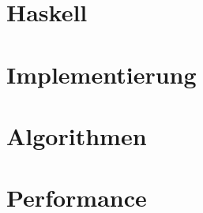 \documentclass[ngerman
  ,fontsize=11pt %
  ,numbers=noenddot %
  ,parskip=half*
  ,openany
  ,DIV=10
  ,fleqn %
  ,oneside
]{./myClass}
\begin{document}
\ifnum{}
  \frontmatter
  
  \newpage \thispagestyle{empty} \mbox{}
\else
  \mainmatter
\fi

\tableofcontents{}


\ifnum{}
  \mainmatter
\fi

%

\chapter{Haskell}


\chapter{Implementierung}


%
%
%
%

\chapter{Algorithmen}
%


\chapter{Performance}

%
%


%

\pagebreak
\printbibliography

\appendix
{}



\end{document}
